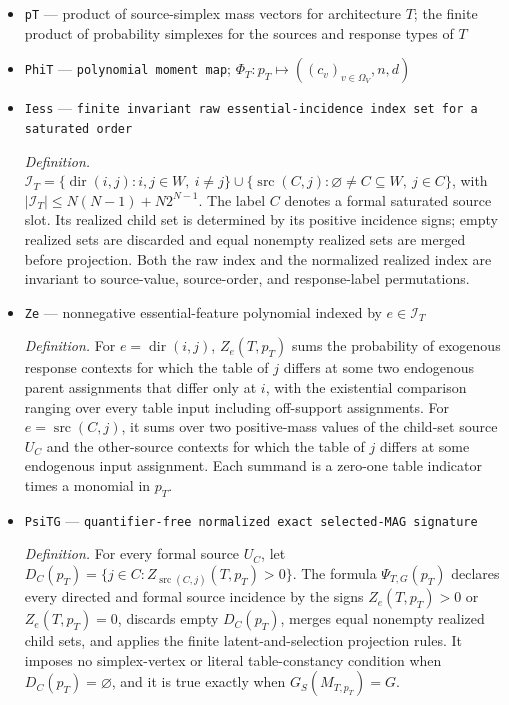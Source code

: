\documentclass{article}
\begin{document}
\begin{itemize}
  \item \texttt{pT} --- product of source-simplex mass vectors for architecture \(T\); the finite product of probability simplexes for the sources and response types of \(T\)
  \item \texttt{PhiT} --- \texttt{polynomial moment map}; \(\Phi_T:p_T\mapsto((c_v)_{v\in\Omega_V},n,d)\)
  \item \texttt{Iess} --- \texttt{finite invariant raw essential-\allowbreak{}incidence index set for a saturated order}
  \par\smallskip\noindent\emph{Definition.} \(\mathcal I_T=\{\operatorname{dir}(i,j):i,j\in W,\ i\ne j\}\cup\{\operatorname{src}(C,j):\varnothing\ne C\subseteq W,\ j\in C\}\), with \( |\mathcal I_T|\le N(N-1)+N2^{N-1}\).  The label \(C\) denotes a formal saturated source slot.  Its realized child set is determined by its positive incidence signs; empty realized sets are discarded and equal nonempty realized sets are merged before projection.  Both the raw index and the normalized realized index are invariant to source-value, source-order, and response-label permutations.
  \item \texttt{Ze} --- nonnegative essential-feature polynomial indexed by \(e\in\mathcal I_T\)
  \par\smallskip\noindent\emph{Definition.} For \(e=\operatorname{dir}(i,j)\), \(Z_e(T,p_T)\) sums the probability of exogenous response contexts for which the table of \(j\) differs at some two endogenous parent assignments that differ only at \(i\), with the existential comparison ranging over every table input including off-support assignments. For \(e=\operatorname{src}(C,j)\), it sums over two positive-mass values of the child-set source \(U_C\) and the other-source contexts for which the table of \(j\) differs at some endogenous input assignment. Each summand is a zero-one table indicator times a monomial in \(p_T\).
  \item \texttt{PsiTG} --- \texttt{quantifier-\allowbreak{}free normalized exact selected-\allowbreak{}MAG signature}
  \par\smallskip\noindent\emph{Definition.} For every formal source \(U_C\), let \(D_C(p_T)=\{j\in C:Z_{\operatorname{src}(C,j)}(T,p_T)>0\}\).  The formula \(\Psi_{T,G}(p_T)\) declares every directed and formal source incidence by the signs \(Z_e(T,p_T)>0\) or \(Z_e(T,p_T)=0\), discards empty \(D_C(p_T)\), merges equal nonempty realized child sets, and applies the finite latent-and-selection projection rules.  It imposes no simplex-vertex or literal table-constancy condition when \(D_C(p_T)=\varnothing\), and it is true exactly when \(G_S(M_{T,p_T})=G\).

\end{itemize}
\end{document}
